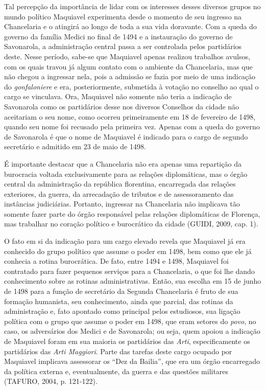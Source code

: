 Tal percepção da importância de lidar com os interesses desses diversos
grupos no mundo político Maquiavel experimenta desde o momento de seu
ingresso na Chancelaria e o atingirá ao longo de toda a sua vida
doravante. Com a queda do governo da família Medici no final de 1494 e a
instauração do governo de Savonarola, a administração central passa a
ser controlada pelos partidários deste. Nesse período, sabe-se que
Maquiavel apenas realizou trabalhos avulsos, com os quais travou já
algum contato com o ambiente da Chancelaria, mas que não chegou a
ingressar nela, pois a admissão se fazia por meio de uma indicação do
\emph{gonfaloniere} e era, posteriormente, submetida à votação no
conselho ao qual o cargo se vinculava. Ora, Maquiavel não somente não
teria a indicação de Savonarola como os partidários desse nos diversos
Conselhos da cidade não aceitariam o seu nome, como ocorreu
primeiramente em 18 de fevereiro de 1498, quando seu nome foi recusado
pela primeira vez. Apenas com a queda do governo de Savonarola é que o
nome de Maquiavel é indicado para o cargo de segundo secretário e
admitido em 23 de maio de 1498.

É importante destacar que a Chancelaria não era apenas uma repartição da
burocracia voltada exclusivamente para as relações diplomáticas, mas o
órgão central da administração da república florentina, encarregada das
relações exteriores, da guerra, da arrecadação de tributos e de
assessoramento das instâncias judiciárias. Portanto, ingressar na
Chancelaria não implicava tão somente fazer parte do órgão responsável
pelas relações diplomáticas de Florença, mas trabalhar no coração
político e burocrático da cidade (GUIDI, 2009, cap. 1).

O fato em si da indicação para um cargo elevado revela que Maquiavel já
era conhecido do grupo político que assume o poder em 1498, bem como que
ele já conhecia a rotina burocrática. De fato, entre 1494 e 1498,
Maquiavel foi contratado para fazer pequenos serviços para a
Chancelaria, o que foi lhe dando conhecimento sobre as rotinas
administrativas. Então, sua escolha em 15 de junho de 1498 para a função
de secretário da Segunda Chancelaria é fruto de sua formação humanista,
seu conhecimento, ainda que parcial, das rotinas da administração e,
fato apontado como principal pelos estudiosos, sua ligação política com
o grupo que assume o poder em 1498, que eram setores do \emph{povo}, no
caso, os adversários dos Medici e de Savonarola; ou seja, quem apoiou a
indicação de Maquiavel foram em sua maioria os partidários das
\emph{Arti}, especificamente os partidários das \emph{Arti Maggiori}.
Parte das tarefas deste cargo ocupado por Maquiavel implicava assessorar
os ``Dez da Bailia'', que era um órgão encarregado da política externa
e, eventualmente, da guerra e das questões militares (TAFURO, 2004, p.
121-122).

